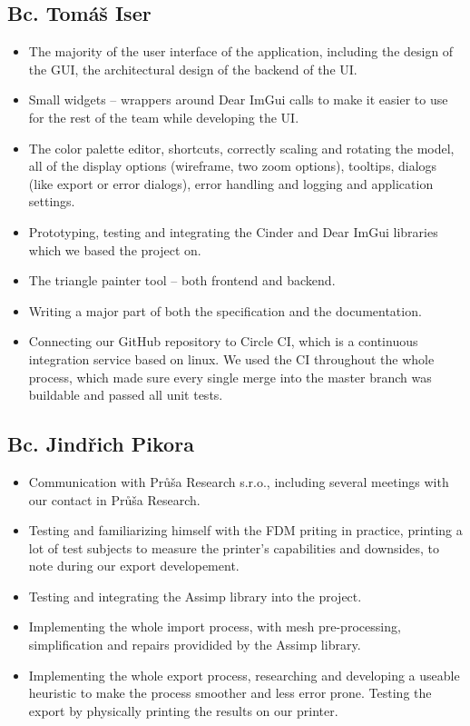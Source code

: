 \subsection{Bc. Tomáš Iser}
\begin{itemize}
\item The majority of the user interface of the application, including the design of the GUI, the architectural design of the backend of the UI.
\item Small widgets -- wrappers around Dear ImGui calls to make it easier to use for the rest of the team while developing the UI.
\item The color palette editor, shortcuts, correctly scaling and rotating the model, all of the display options (wireframe, two zoom options), tooltips, dialogs (like export or error dialogs), error handling and logging and application settings.
\item Prototyping, testing and integrating the Cinder and Dear ImGui libraries which we based the project on.
\item The triangle painter tool -- both frontend and backend.
\item Writing a major part of both the specification and the documentation.
\item Connecting our GitHub repository to Circle CI, which is a continuous integration service based on linux. We used the CI throughout the whole process, which made sure every single merge into the master branch was buildable and passed all unit tests.
\end{itemize}

\subsection{Bc. Jindřich Pikora}
\begin{itemize}
\item Communication with Průša Research s.r.o., including several meetings with our contact in Průša Research.
\item Testing and familiarizing himself with the FDM priting in practice, printing a lot of test subjects to measure the printer's capabilities and downsides, to note during our export developement.
\item Testing and integrating the Assimp library into the project.
\item Implementing the whole import process, with mesh pre-processing, simplification and repairs providided by the Assimp library.
\item Implementing the whole export process, researching and developing a useable heuristic to make the process smoother and less error prone. Testing the export by physically printing the results on our printer.
\end{itemize}

